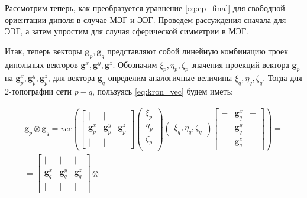 Рассмотрим теперь, как преобразуется уравнение \ref{eq:cp_final}
для свободной ориентации диполя в случае МЭГ и ЭЭГ.
Проведем рассуждения сначала для ЭЭГ, а затем упростим для случая сферической симметрии в МЭГ.

Итак, теперь векторы $\mathbf{g}_p, \mathbf{g}_q$ представляют собой
линейную комбинацию троек дипольных векторов $\mathbf{g}^x, \mathbf{g}^y, \mathbf{g}^z$.
Обозначим $\xi_p, \eta_p, \zeta_p$ значения проекций вектора $\mathbf{g}_p$ на
$\mathbf{g}_p^x, \mathbf{g}_p^y, \mathbf{g}_p^z$, для вектора $\mathbf{g}_q$ определим аналогичные величины
$\xi_q, \eta_q, \zeta_q$. Тогда для 2-топографии сети $p-q$, пользуясь \ref{eq:kron_vec} будем иметь:

\begin{multline}
    \mathbf{g}_p \otimes \mathbf{g}_q =
    vec\left(
        \begin{bmatrix}
            |              & |              & |              \\
            \mathbf{g}_p^x & \mathbf{g}_p^y & \mathbf{g}_p^z \\
            |              & |              & |
        \end{bmatrix}
        \left( \begin{array}{ccc}
                \xi_p \\
                \eta_p \\
                \zeta_p \\
            \end{array}
        \right)
        \left(\begin{array}{ccc}
                \xi_q,
                \eta_q,
                \zeta_q
            \end{array}
        \right)
        \begin{bmatrix}
            -             & \mathbf{g}_q^x & -   \\
            -             & \mathbf{g}_q^y & -   \\
            -             & \mathbf{g}_q^z & -
        \end{bmatrix}
    \right) = \\
  = \begin{bmatrix}
        |                 & |              & |              \\
        \mathbf{g}_q^x    & \mathbf{g}_q^y & \mathbf{g}_q^z \\
        |                 & |              & |
    \end{bmatrix}
    \otimes

\end{multline}
